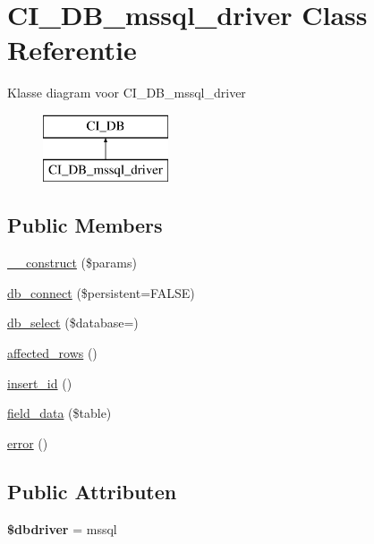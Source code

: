\hypertarget{class_c_i___d_b__mssql__driver}{}\section{C\+I\+\_\+\+D\+B\+\_\+mssql\+\_\+driver Class Referentie}
\label{class_c_i___d_b__mssql__driver}
Klasse diagram voor C\+I\+\_\+\+D\+B\+\_\+mssql\+\_\+driver\begin{figure}[H]
\begin{center}
\leavevmode
\includegraphics[height=2.000000cm]{class_c_i___d_b__mssql__driver}
\end{center}
\end{figure}
\subsection*{Public Members}
\begin{DoxyCompactItemize}
\item 
\mbox{\hyperlink{class_c_i___d_b__mssql__driver_a9162320adff1a1a4afd7f2372f753a3e}{\+\_\+\+\_\+construct}} (\$params)
\item 
\mbox{\hyperlink{class_c_i___d_b__mssql__driver_a52bf595e79e96cc0a7c907a9b45aeb4d}{db\+\_\+connect}} (\$persistent=F\+A\+L\+SE)
\item 
\mbox{\hyperlink{class_c_i___d_b__mssql__driver_a18ae9c21870b30b45337c5e3626190cc}{db\+\_\+select}} (\$database=\textquotesingle{}\textquotesingle{})
\item 
\mbox{\hyperlink{class_c_i___d_b__mssql__driver_a77248aaad33eb132c04cc4aa3f4bc8cb}{affected\+\_\+rows}} ()
\item 
\mbox{\hyperlink{class_c_i___d_b__mssql__driver_a933f2cde8dc7f87875e257d0a4902e99}{insert\+\_\+id}} ()
\item 
\mbox{\hyperlink{class_c_i___d_b__mssql__driver_a90355121e1ed009e0efdbd544ab56efa}{field\+\_\+data}} (\$table)
\item 
\mbox{\hyperlink{class_c_i___d_b__mssql__driver_a43b8d30b879d4f09ceb059b02af2bc02}{error}} ()
\end{DoxyCompactItemize}
\subsection*{Public Attributen}
\begin{DoxyCompactItemize}
\item 
\mbox{\label{class_c_i___d_b__mssql__driver_a0cde2a16322a023d040aa7f725877597}} 
{\bfseries \$dbdriver} = \textquotesingle{}mssql\textquotesingle{}
\end{DoxyCompactItemize}
